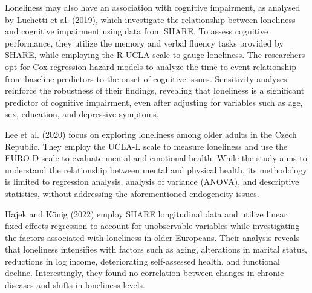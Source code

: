     Loneliness may also have an association with cognitive impairment, as analysed by Luchetti et al. (2019), which investigate the relationship between loneliness and cognitive impairment using data from SHARE. To assess cognitive performance, they utilize the memory and verbal fluency tasks provided by SHARE, while employing the R-UCLA scale to gauge loneliness. The researchers opt for Cox regression hazard models to analyze the time-to-event relationship from baseline predictors to the onset of cognitive issues. Sensitivity analyses reinforce the robustness of their findings, revealing that loneliness is a significant predictor of cognitive impairment, even after adjusting for variables such as age, sex, education, and depressive symptoms.

    Lee et al. (2020) focus on exploring loneliness among older adults in the Czech Republic. They employ the UCLA-L scale to measure loneliness and use the EURO-D scale to evaluate mental and emotional health. While the study aims to understand the relationship between mental and physical health, its methodology is limited to regression analysis, analysis of variance (ANOVA), and descriptive statistics, without addressing the aforementioned endogeneity issues.

    Hajek and König (2022) employ SHARE longitudinal data and utilize linear fixed-effects regression to account for unobservable variables while investigating the factors associated with loneliness in older Europeans. Their analysis reveals that loneliness intensifies with factors such as aging, alterations in marital status, reductions in log income, deteriorating self-assessed health, and functional decline. Interestingly, they found no correlation between changes in chronic diseases and shifts in loneliness levels.

